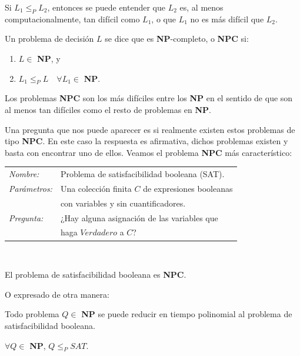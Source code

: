 Si $L_1 \leq_P L_2$, entonces se puede entender que $L_2$ es, al menos
computacionalmente, tan difícil como $L_1$, o que $L_1$ no es más difícil que $L_2$.

\begin{definition}
	Un problema de decisión $L$ se dice que es \textbf{NP}-completo, o \textbf{NPC} si:
	\begin{enumerate}[label=(\roman*)]
		\item $L \in $ \textbf{NP}, y
		\item $L_1 \leq_P L \quad \forall L_1 \in $ \textbf{NP}.
	\end{enumerate}
\end{definition}

\hfil

Los problemas \textbf{NPC} son los más difíciles entre los \textbf{NP}
en el sentido de que son al menos tan difíciles como el resto de
problemas en \textbf{NP}.

Una pregunta que nos puede aparecer es si realmente existen estos problemas de
tipo \textbf{NPC}. En este caso la respuesta es afirmativa, dichos problemas
existen y basta con encontrar uno de ellos.
Veamos el problema \textbf{NPC} más característico:

\begin{tabular}{|ll}
	\textit{Nombre:} & Problema de satisfacibilidad booleana (SAT). \\
	\textit{Parámetros:} & Una colección finita $C$ de expresiones booleanas \\
	&  con variables y sin cuantificadores. \\
	\textit{Pregunta:} & ¿Hay alguna asignación de las variables que \\ & haga $Verdadero$ a $C$? \\
\end{tabular}
\\

\begin{theorem}
	El problema de satisfacibilidad booleana es \textbf{NPC}.
\end{theorem}

O expresado de otra manera:

\begin{theorem}
	\label{redNPC:theo}
	Todo problema $Q \in $ \textbf{NP} se puede reducir en tiempo polinomial al problema de satisfacibilidad booleana.

	$\forall Q \in $ \textbf{NP}, $Q \leq_P SAT$.
\end{theorem}


